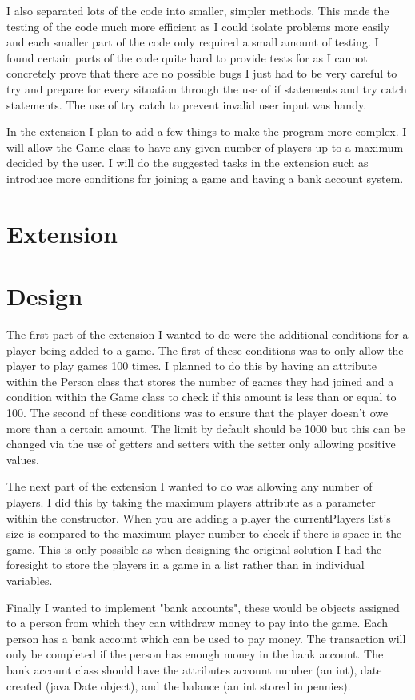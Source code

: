 \documentclass[a4paper]{article}
\begin{document}
I also separated lots of the code into smaller, simpler methods. This made the testing of the code much more efficient as I could isolate problems more easily and each smaller part of the code only required a small amount of testing. I found certain parts of the code quite hard to provide tests for as I cannot concretely prove that there are no possible bugs I just had to be very careful to try and prepare for every situation through the use of if statements and try catch statements. The use of try catch to prevent invalid user input was handy.

In the extension I plan to add a few things to make the program more complex. I will allow the Game class to have any given number of players up to a maximum decided by the user. I will do the suggested tasks in the extension such as introduce more conditions for joining a game and having a bank account system.

\section*{Extension}
\section*{Design}
The first part of the extension I wanted to do were the additional conditions for a player being added to a game. The first of these conditions was to only allow the player to play games 100 times. I planned to do this by having an attribute within the Person class that stores the number of games they had joined and a condition within the Game class to check if this amount is less than or equal to 100. The second of these conditions was to ensure that the player doesn't owe more than a certain amount. The limit by default should be 1000 but this can be changed via the use of getters and setters with the setter only allowing positive values.

The next part of the extension I wanted to do was allowing any number of players. I did this by taking the maximum players attribute as a parameter within the constructor. When you are adding a player the currentPlayers list's size is compared to the maximum player number to check if there is space in the game. This is only possible as when designing the original solution I had the foresight to store the players in a game in a list rather than in individual variables.

Finally I wanted to implement "bank accounts", these would be objects assigned to a person from which they can withdraw money to pay into the game. Each person has a bank account which can be used to pay money. The transaction will only be completed if the person has enough money in the bank account. The bank account class should have the attributes account number (an int), date created (java Date object), and the balance (an int stored in pennies).
\end{document}
